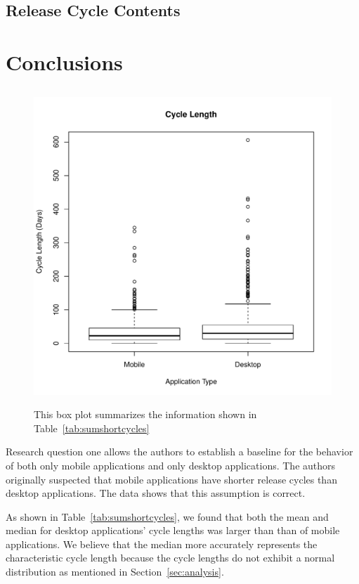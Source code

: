 \documentclass{acm_proc_article-sp}
\begin{document}
\subsection{Release Cycle Contents}



\section{Conclusions}


\subsection{\RQOne }



\begin{figure}
\includegraphics[width=.5\textwidth]{ShortCycleBoxPlot.pdf}
\label{fig:ShortCycleBox}
\caption{This box plot summarizes the information shown in Table~\ref{tab:sumshortcycles}}
\end{figure}


\label{tab:sumshortcycles}



\label{tab:shortcycles}


Research question one allows the authors to establish a baseline for the behavior of both only mobile applications and only desktop applications.
The authors originally suspected that mobile applications have shorter release cycles than desktop applications.
The data shows that this assumption is correct. 

As shown in Table~\ref{tab:sumshortcycles}, we found that both the mean and median for desktop applications' cycle lengths was larger than than of mobile applications. 
We believe that the median more accurately represents the characteristic cycle length because the cycle lengths do not exhibit a normal distribution as mentioned in Section~\ref{sec:analysis}. 
\end{document}
